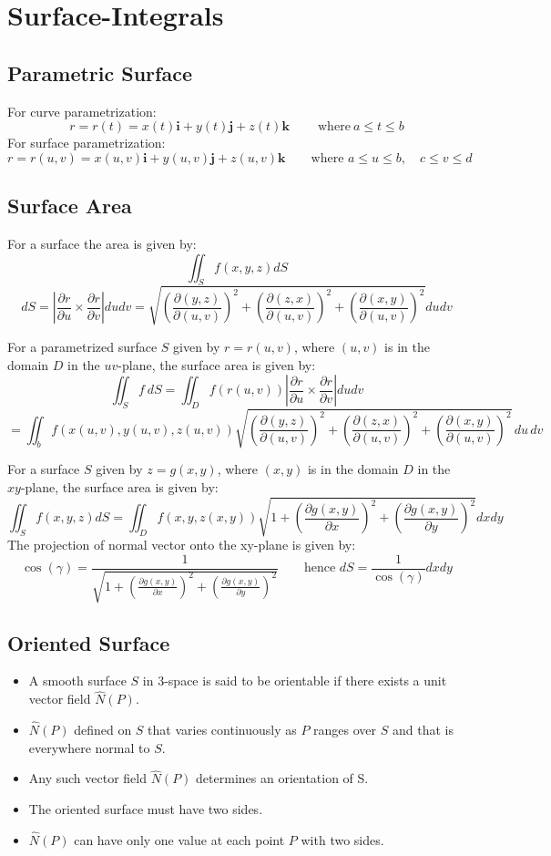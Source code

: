 \section{Surface-Integrals}
\subsection{Parametric Surface}
For curve parametrization:
$$r=r(t)=x(t)\mathbf{i}+y(t)\mathbf{j}+z(t)\mathbf{k}\qquad{\mathrm{~where~}}a\leq t\leq b$$
For surface parametrization:
$$r=r(u,v)=x(u,v)\mathbf{i}+y(u,v)\mathbf{j}+z(u,v)\mathbf{k}\qquad{\text{where }}a\leq u\leq b,\quad c\leq v\leq d$$
\subsection{Surface Area}
For a surface the area is given by:
$$\iint_{S}f(x,y,z)d S$$
$$dS=\left|\frac{ \partial r }{ \partial u } \times \frac{ \partial r }{ \partial v } \right|d u d v
=\sqrt{ \left(\frac{ \partial (y,z) }{ \partial (u,v) } \right)^{2}+\left(\frac{ \partial (z,x) }{ \partial (u,v) } \right)^{2}+\left(\frac{ \partial (x,y)}{ \partial (u,v) } \right)^{2}}d u d v$$

For a parametrized surface $S$ given by $r=r(u,v)$, where $(u,v)$ is in the domain $D$ in the $uv$-plane, the surface area is given by:
$$\iint_{S}f \ d S=\iint_{D}f(r(u,v))\left|\frac{ \partial r }{ \partial u } \times \frac{ \partial r }{ \partial v } \right|d u d v$$
$$=\iint_{b}f(x(u,v),y(u,v),z(u,v)){\sqrt{\left({\frac{\partial(y,z)}{\partial(u,v)}}\right)^{2}+\left({\frac{\partial(z,x)}{\partial(u,v)}}\right)^{2}+\left({\frac{\partial(x,y)}{\partial(u,v)}}\right)^{2}}}\,d u\,d v$$

For a surface $S$ given by $z=g(x,y)$, where $(x,y)$ is in the domain $D$ in the $xy$-plane, the surface area is given by:
$$\iint_{S}f(x,y,z)d S=\iint_{D}f(x,y,z(x,y))\sqrt{1+\left(\frac{ \partial g(x,y) }{ \partial x } \right)^{2}+\left(\frac{ \partial g(x,y) }{ \partial y } \right)^{2}}d x d y$$ 
The projection of normal vector onto the xy-plane is given by:
$$\cos(\gamma)=\frac{1}{\sqrt{1+\left(\frac{ \partial g(x,y) }{ \partial x } \right)^{2}+\left(\frac{ \partial g(x,y) }{ \partial y } \right)^{2}}}
\qquad \text{hence }dS=\frac{1}{\cos(\gamma)}dxdy
$$
\subsection{Oriented Surface}
\begin{itemize}
  \item A smooth surface $S$ in 3-space is said to be orientable if there exists a unit vector field $\widehat{N}(P)$.
  \item $\widehat{N}(P)$ defined on $S$ that varies continuously as $P$ ranges over $S$ and that is everywhere normal to $S$.
  \item Any such vector field $\widehat{N}(P)$ determines an orientation of S. 
  \item The oriented surface must have two sides.
  \item $\widehat{N}(P)$ can have only one value at each point $P$ with two sides.
\end{itemize}
